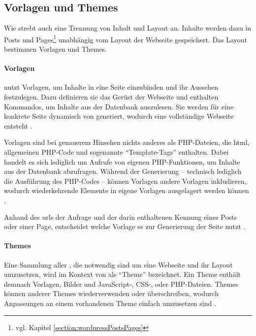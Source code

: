     \subsection{Vorlagen und Themes}
        \label{section:wordpressTemplatesThemes}
        Wie {\imperia} strebt auch {\wordpress} eine Trennung von
        Inhalt und Layout an.
        Inhalte werden dazu in
        Posts und Pages\footnote{vgl. Kapitel \ref{section:wordpressPostsPages}}
        unabhängig vom Layout der Webseite gespeichert.
        Das Layout bestimmen Vorlagen und Themes.

        \paragraph*{Vorlagen}
        {\wordpress} nutzt Vorlagen, um Inhalte in eine Seite einzubinden
        und ihr Aussehen festzulegen.
        Dazu definieren sie das Gerüst der Webseite und enthalten Kommandos,
        um Inhalte aus der Datenbank auszulesen.
        Sie werden für eine konkrete Seite dynamisch von {\wordpress} generiert,
        wodurch eine vollständige Webseite entsteht
        \cite{wordpress:Templates}.

        Vorlagen sind bei genauerem Hinsehen nichts anderes als PHP-Dateien,
        die \gls{html}, allgemeinen PHP-Code und sogenannte
        "`Template-Tags"' enthalten.
        Dabei handelt es sich lediglich um Aufrufe von
        {\wordpress} eigenen PHP-Funktionen,
        um Inhalte aus der Datenbank abzufragen.
        Während der Generierung -- technisch lediglich die Ausführung
        des PHP-Codes -- können Vorlagen andere Vorlagen inkludieren,
        wodurch wiederkehrende Elemente in eigene Vorlagen ausgelagert
        werden können \cite{wordpress:TemplateFiles}.

        Anhand des \glspl{url} der Anfrage und der darin enthaltenen
        Kennung eines Posts oder einer Page,
        entscheidet {\wordpress} welche Vorlage es zur Generierung der Seite nutzt
        \cite{wordpress:TemplateHierarchy}.

        \paragraph*{Themes}
        Eine Sammlung aller {\resources}, die notwendig sind um
        eine Webseite und ihr Layout umzusetzen,
        wird im Kontext von {\wordpress} als "`Theme"' bezeichnet.
        Ein Theme enthält demnach Vorlagen, Bilder und
        JavaScript-, CSS-, oder PHP-Dateien.
        Themes können {\resources} anderer Themes wiederverwenden oder überschreiben,
        wodurch Anpassungen an einem vorhandenen Theme einfach umzusetzen sind
        \cite{wordpress:Themes}.

